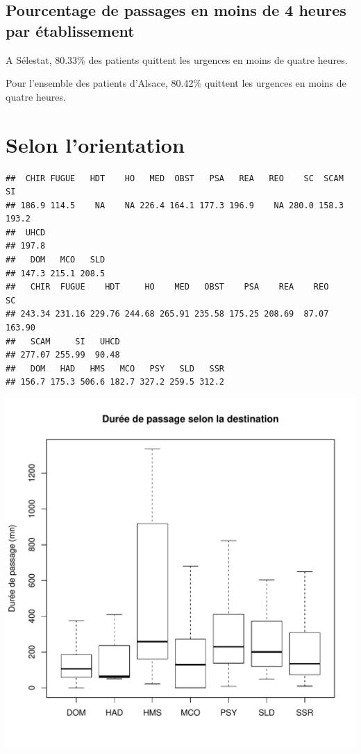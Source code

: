 \documentclass[12pt,english,french,twoside]{report}\usepackage[]{graphicx}\usepackage[]{color}
\makeatletter
\def\maxwidth{ %
  \ifdim\Gin@nat@width>\linewidth
    \linewidth
  \else
    \Gin@nat@width
  \fi
}
\newenvironment{kframe}{%
 \def\at@end@of@kframe{}%
 \ifinner\ifhmode%
  \def\at@end@of@kframe{\end{minipage}}%
  \begin{minipage}{\columnwidth}%
 \fi\fi%
 \def\FrameCommand##1{\hskip\@totalleftmargin \hskip-\fboxsep
 \colorbox{shadecolor}{##1}\hskip-\fboxsep
     \hskip-\linewidth \hskip-\@totalleftmargin \hskip\columnwidth}%
 \MakeFramed {\advance\hsize-\width
   \@totalleftmargin\z@ \linewidth\hsize
   \@setminipage}}%
 {\par\unskip\endMakeFramed%
 \at@end@of@kframe}
\newenvironment{knitrout}{}{} %
\makeatother
\begin{document}
\subsection*{Pourcentage de passages en moins de 4 heures par établissement}




A Sélestat, 80.33\% des patients quittent les urgences en moins de quatre heures.

Pour l'ensemble des patients d'Alsace, 80.42\% quittent les urgences en moins de quatre heures.


\section*{Selon l'orientation}
\begin{knitrout}
\color{fgcolor}\begin{kframe}
\begin{verbatim}
##  CHIR FUGUE   HDT    HO   MED  OBST   PSA   REA   REO    SC  SCAM    SI 
## 186.9 114.5    NA    NA 226.4 164.1 177.3 196.9    NA 280.0 158.3 193.2 
##  UHCD 
## 197.8
##   DOM   MCO   SLD 
## 147.3 215.1 208.5
##   CHIR  FUGUE    HDT     HO    MED   OBST    PSA    REA    REO     SC 
## 243.34 231.16 229.76 244.68 265.91 235.58 175.25 208.69  87.07 163.90 
##   SCAM     SI   UHCD 
## 277.07 255.99  90.48
##   DOM   HAD   HMS   MCO   PSY   SLD   SSR 
## 156.7 175.3 506.6 182.7 327.2 259.5 312.2
\end{verbatim}
\end{kframe}
\includegraphics[width=\maxwidth]{figure/duree_orientation} 

\end{knitrout}
\end{document}
